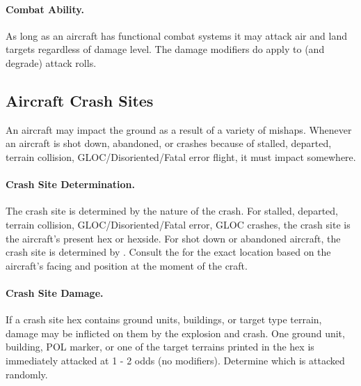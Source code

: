 \paragraph{Combat Ability.} As long as an aircraft has functional combat systems it may attack air and land targets regardless of damage level. The damage modifiers do apply to (and degrade) attack rolls.

\subsection{Aircraft Crash Sites}


An aircraft may impact the ground as a result of a variety of mishaps. Whenever an aircraft is shot down, abandoned, or crashes because of stalled, departed, terrain collision, GLOC/Disoriented/Fatal error flight, it must impact somewhere.

\paragraph{Crash Site Determination.} The crash site is determined by the nature of the crash. For stalled, departed, terrain collision, GLOC/Disoriented/Fatal error, GLOC crashes, the crash site is the aircraft's present hex or hexside. For shot down or abandoned aircraft, the crash site is determined by . Consult the  for the exact location based on the aircraft's facing and position at the moment of the craft.

\paragraph{Crash Site Damage.} If a crash site hex contains ground units, buildings, or target type terrain, damage may be inflicted on them by the explosion and crash. One ground unit, building, POL marker, or one of the target terrains printed in the hex is immediately attacked at 1 - 2 odds (no modifiers). Determine which is attacked randomly.

